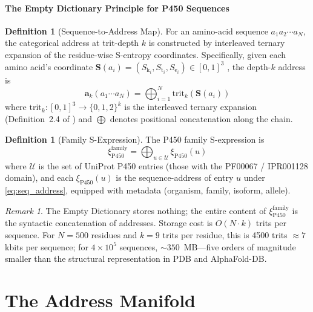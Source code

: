 \documentclass[11pt,twocolumn,a4paper]{article}
\theoremstyle{definition}
\newtheorem{definition}[theorem]{Definition}
\theoremstyle{remark}
\newtheorem{remark}[theorem]{Remark}
\newcommand{\Sk}{S_{\mathrm{k}}}
\newcommand{\St}{S_{\mathrm{t}}}
\newcommand{\Se}{S_{\mathrm{e}}}
\newcommand{\Scoord}{\mathbf{S}}
\newcommand{\Sexp}{\xi}
\newcommand{\addr}{\mathbf{a}}
\begin{document}
\subsection{The Empty Dictionary Principle for P450 Sequences}

\begin{definition}[Sequence-to-Address Map]
\label{def:seq_to_addr}
For an amino-acid sequence $a_1 a_2 \cdots a_N$, the categorical address at trit-depth $k$ is constructed by interleaved ternary expansion of the residue-wise S-entropy coordinates. Specifically, given each amino acid's coordinate $\Scoord(a_i) = (\Sk_i, \St_i, \Se_i) \in [0,1]^3$ \citep{sachikonye2025c}, the depth-$k$ address is
\begin{equation}
\addr_k(a_1 \cdots a_N) = \bigoplus_{i=1}^{N} \mathrm{trit}_k(\Scoord(a_i))
\label{eq:seq_address}
\end{equation}
where $\mathrm{trit}_k: [0,1]^3 \to \{0,1,2\}^k$ is the interleaved ternary expansion (Definition~2.4 of \citep{sachikonye2025c}) and $\bigoplus$ denotes positional concatenation along the chain.
\end{definition}

\begin{definition}[Family S-Expression]
\label{def:family_sexp}
The P450 family S-expression is
\begin{equation}
\Sexp_{\mathrm{P450}}^{\mathrm{family}} = \bigoplus_{u \in \mathcal{U}} \Sexp_{\mathrm{P450}}(u)
\end{equation}
where $\mathcal{U}$ is the set of UniProt P450 entries (those with the PF00067 / IPR001128 domain), and each $\Sexp_{\mathrm{P450}}(u)$ is the sequence-address of entry $u$ under \cref{eq:seq_address}, equipped with metadata (organism, family, isoform, allele).
\end{definition}

\begin{remark}
The Empty Dictionary stores nothing; the entire content of $\Sexp_{\mathrm{P450}}^{\mathrm{family}}$ is the syntactic concatenation of addresses. Storage cost is $O(N \cdot k)$ trits per sequence. For $N = 500$ residues and $k = 9$ trits per residue, this is 4500 trits $\approx 7$ kbits per sequence; for $4 \times 10^5$ sequences, $\sim 350$~MB---five orders of magnitude smaller than the structural representation in PDB and AlphaFold-DB.
\end{remark}

\part{The Address Manifold}
\end{document}
